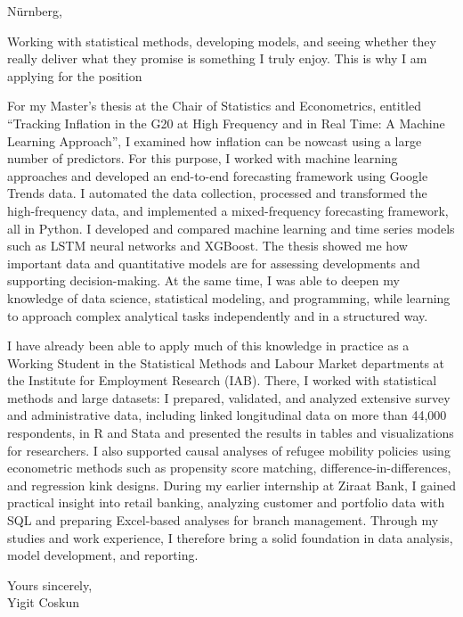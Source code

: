 









\vspace{18pt}


\begin{flushright}
Nürnberg, 
\end{flushright}

\vspace{10pt}




Working with statistical methods, developing models, and seeing whether they really deliver what they promise is something I truly enjoy. This is why I am applying for the position 

For my Master’s thesis at the Chair of Statistics and Econometrics, entitled “Tracking Inflation in the G20 at High Frequency and in Real Time: A Machine Learning Approach”, I examined how inflation can be nowcast using a large number of predictors. For this purpose, I worked with machine learning approaches and developed an end-to-end forecasting framework using Google Trends data. I automated the data collection, processed and transformed the high-frequency data, and implemented a mixed-frequency forecasting framework, all in Python. I developed and compared machine learning and time series models such as LSTM neural networks and XGBoost. The thesis showed me how important data and quantitative models are for assessing developments and supporting decision-making. At the same time, I was able to deepen my knowledge of data science, statistical modeling, and programming, while learning to approach complex analytical tasks independently and in a structured way.

I have already been able to apply much of this knowledge in practice as a Working Student in the Statistical Methods and Labour Market departments at the Institute for Employment Research (IAB). There, I worked with statistical methods and large datasets: I prepared, validated, and analyzed extensive survey and administrative data, including linked longitudinal data on more than 44,000 respondents, in R and Stata and presented the results in tables and visualizations for researchers. I also supported causal analyses of refugee mobility policies using econometric methods such as propensity score matching, difference-in-differences, and regression kink designs. During my earlier internship at Ziraat Bank, I gained practical insight into retail banking, analyzing customer and portfolio data with SQL and preparing Excel-based analyses for branch management. Through my studies and work experience, I therefore bring a solid foundation in data analysis, model development, and reporting.


\vspace{12pt}

Yours sincerely, \\
Yigit Coskun



